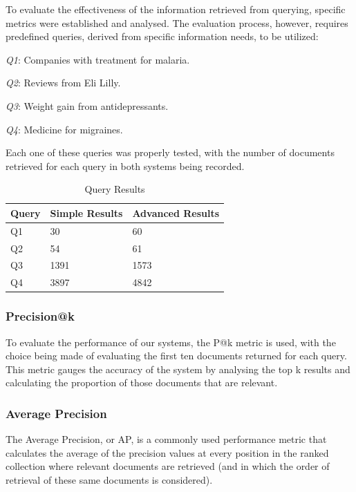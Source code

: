 \documentclass[sigconf]{acmart}
\begin{document}
To evaluate the effectiveness of the information retrieved from querying, specific metrics were established and analysed. The evaluation process, however, requires predefined queries, derived from specific information needs, to be utilized:

\begin{arrowlist}
	\item \textit{Q1}: Companies with treatment for malaria.
	\item \textit{Q2}: Reviews from Eli Lilly.
	\item \textit{Q3}: Weight gain from antidepressants.
	\item \textit{Q4}: Medicine for migraines.
\end{arrowlist}

Each one of these queries was properly tested, with the number of documents retrieved for each query in both systems being recorded.

\begin{table}[H]
	\begin{tabular}{ | m{5em} | m{1cm}| m{1.2cm} | }
		\hline
		Query& Simple Results & Advanced Results \\
		\hline
		Q1 & 30 & 60 \\
		\hline
		Q2 & 54 & 61 \\
		\hline
		Q3 & 1391 & 1573 \\
		\hline
		Q4 & 3897 & 4842 \\
		\hline
	\end{tabular}
	\caption{Query Results}
	\label{tab:query_results}
\end{table}

\subsubsection{Precision@k}

To evaluate the performance of our systems, the P@k metric\cite{pak} is used, with the choice being made of evaluating the first ten documents returned for each query. This metric gauges the accuracy of the system by analysing the top k results and calculating the proportion of those documents that are relevant.

\subsubsection{Average Precision}

The Average Precision\cite{map}, or AP, is a commonly used performance metric that calculates the average of the precision values at every position in the ranked collection where relevant documents are retrieved (and in which the order of retrieval of these same documents is considered).
\end{document}
